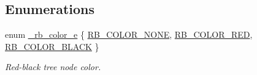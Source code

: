 \subsection*{Enumerations}
\begin{CompactItemize}
\item 
enum \hyperlink{group__dbprim__rbtree_ga53}{\_\-rb\_\-color\_\-e} \{ \hyperlink{group__dbprim__rbtree_gga53a139}{RB\_\-COLOR\_\-NONE}, 
\hyperlink{group__dbprim__rbtree_gga53a140}{RB\_\-COLOR\_\-RED}, 
\hyperlink{group__dbprim__rbtree_gga53a141}{RB\_\-COLOR\_\-BLACK}
 \}
\begin{CompactList}\small\item\em Red-black tree node color. \item\end{CompactList}\end{CompactItemize}
